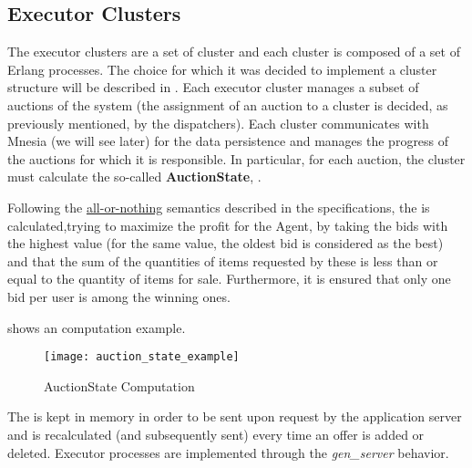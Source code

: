 \subsection{Executor Clusters}\label{subsec:archexecutors}

The executor clusters are a set of cluster and each cluster is composed of a set
of Erlang processes. The choice for which it was decided to implement a cluster
structure will be described in . Each executor
cluster manages a subset of auctions of the system (the assignment of an auction
to a cluster is decided, as previously mentioned, by the dispatchers). Each
cluster communicates with Mnesia (we will see later) for the data persistence
and manages the progress of the auctions for which it is responsible. In
particular, for each auction, the cluster must calculate the so-called
\textbf{AuctionState}, .


Following the \underline{all-or-nothing} semantics described in the
specifications, the  is calculated,trying to maximize the profit 
for the Agent, by taking the bids with the highest value (for the same value, 
the oldest bid is considered as the best) and that the sum of the quantities of items 
requested by these is less than or equal to the quantity of items for sale. 
Furthermore, it is ensured that only one bid per user is among the winning ones.

 shows an  computation
example.

\begin{figure}[htb]
	\centering
	\texttt{[image: auction\_state\_example]}
	\caption{AuctionState Computation}\label{fig:auction_state_example}
\end{figure}

The  is kept in memory in order to be sent upon request by
the application server and is recalculated (and subsequently sent) every time an
offer is added or deleted. Executor processes are implemented through the
\textit{gen\_server} behavior.
